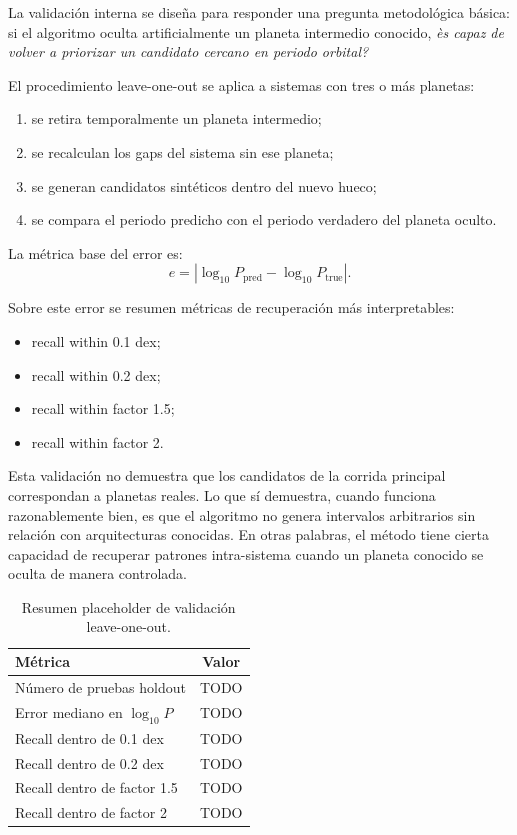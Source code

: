 La validaci\'on interna se dise\~na para responder una pregunta metodol\'ogica b\'asica: si el algoritmo oculta artificialmente un planeta intermedio conocido, \emph{\`es capaz de volver a priorizar un candidato cercano en periodo orbital?}

El procedimiento leave-one-out se aplica a sistemas con tres o m\'as planetas:
\begin{enumerate}
\item se retira temporalmente un planeta intermedio;
\item se recalculan los gaps del sistema sin ese planeta;
\item se generan candidatos sint\'eticos dentro del nuevo hueco;
\item se compara el periodo predicho con el periodo verdadero del planeta oculto.
\end{enumerate}

La m\'etrica base del error es:
\[
e =
\left|
\log_{10} P_{\mathrm{pred}}
-
\log_{10} P_{\mathrm{true}}
\right|.
\]

Sobre este error se resumen m\'etricas de recuperaci\'on m\'as interpretables:
\begin{itemize}
\item recall within 0.1 dex;
\item recall within 0.2 dex;
\item recall within factor 1.5;
\item recall within factor 2.
\end{itemize}

Esta validaci\'on no demuestra que los candidatos de la corrida principal correspondan a planetas reales. Lo que s\'i demuestra, cuando funciona razonablemente bien, es que el algoritmo no genera intervalos arbitrarios sin relaci\'on con arquitecturas conocidas. En otras palabras, el m\'etodo tiene cierta capacidad de recuperar patrones intra-sistema cuando un planeta conocido se oculta de manera controlada.

\begin{table}[H]
\centering
\caption{Resumen placeholder de validaci\'on leave-one-out.}
\label{tab:validation-placeholder}
\begin{tabular}{>{\raggedright\arraybackslash}p{}c}
\toprule
M\'etrica & Valor \\
\midrule
N\'umero de pruebas holdout & TODO \\
Error mediano en $\log_{10} P$ & TODO \\
Recall dentro de 0.1 dex & TODO \\
Recall dentro de 0.2 dex & TODO \\
Recall dentro de factor 1.5 & TODO \\
Recall dentro de factor 2 & TODO \\
\bottomrule
\end{tabular}
\end{table}

